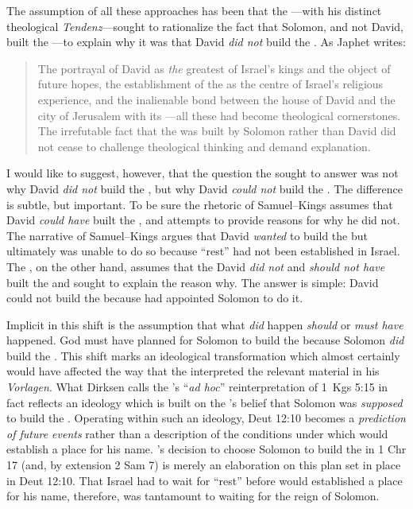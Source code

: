 The assumption of all these approaches has been that the \chronicler---with his distinct theological \emph{Tendenz}---sought to rationalize the fact that Solomon, and not David, built the \temple---to explain why it was that David \emph{did not} build the \temple. As Japhet writes:
\begin{quote}
    The portrayal of David as \emph{the} greatest of Israel's kings and the object of future hopes, the establishment of the \temple as the centre of Israel's religious experience, and the inalienable bond between the house of David and the city of Jerusalem with its \temple---all these had become theological cornerstones. The irrefutable fact that the \temple was built by Solomon rather than David did not cease to challenge theological thinking and demand explanation.\autocite[396]{japhet1993}
\end{quote}
\noindent
I would like to suggest, however, that the question the \chronicler sought to answer was not why David \emph{did not} build the \temple, but why David \emph{could not} build the \temple. The difference is subtle, but important. To be sure the rhetoric of Samuel--Kings assumes that David \emph{could have} built the \temple, and attempts to provide reasons for why he did not. The narrative of Samuel--Kings argues that David \emph{wanted} to build the \temple but ultimately  was unable to do so because ``rest'' had not been established in Israel. The \chronicler, on the other hand, assumes that the David \emph{did not} and \emph{should not have} built the \temple and sought to explain the reason why. The answer is simple: David could not build the \temple because \yahweh had appointed Solomon to do it. 

Implicit in this shift is the assumption that what \emph{did} happen
\emph{should} or \emph{must have} happened. God must have planned for Solomon to build the \temple because Solomon \emph{did} build the \temple. This shift marks an ideological transformation which almost certainly would have affected the way that the \chronicler interpreted the relevant material in his \emph{Vorlagen}. What Dirksen calls the \chronicler's ``\emph{ad hoc}'' reinterpretation of 1~Kgs 5:15 in fact reflects an ideology which is built on the \chronicler's belief that Solomon was \emph{supposed} to build the \temple. Operating within such an ideology, Deut 12:10 becomes a \emph{prediction of future events} rather than a description of the conditions under which \yahweh would establish a place for his name. \yahweh's decision to choose Solomon to build the \temple in 1 Chr 17 (and, by extension 2 Sam 7) is merely an elaboration on this plan set in place in Deut 12:10. That Israel had to wait for ``rest'' before \yahweh would established a place for his name, therefore, was tantamount to waiting for the reign of Solomon. 

